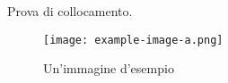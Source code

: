 \documentclass{article}
\begin{document}
\lipsum[1-4] %

Prova di collocamento.

\begin{figure}[ht]
    \centering
    \texttt{[image: example-image-a.png]}
    \caption{Un'immagine d'esempio}
\end{figure}

\lipsum[6-10] %
\end{document}
